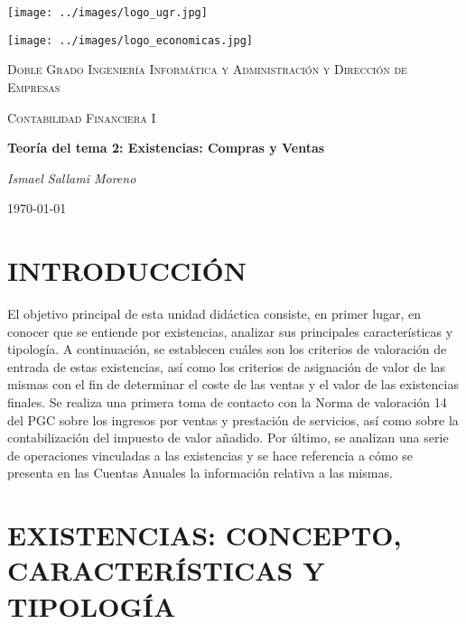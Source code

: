 \documentclass{article}
\newcommand{\myTitle}{Teoría del tema 2: Existencias: Compras y Ventas}
\newcommand{\myAuthor}{Ismael Sallami Moreno}
\newcommand{\myDegree}{Doble Grado Ingeniería Informática y Administración y Dirección de Empresas}
\newcommand{\mySubject}{Contabilidad Financiera I}
\newcommand{\myDate}{\today}
\begin{document}
\begin{titlepage}
    \centering
    \begin{minipage}{0.45\textwidth}
        \centering
        \texttt{[image: ../images/logo\_ugr.jpg]}
    \end{minipage}    \hfill
    \begin{minipage}{0.45\textwidth}
        \centering
        \texttt{[image: ../images/logo\_economicas.jpg]} 
    \end{minipage}
    \vspace{1cm}
    
    {\scshape\LARGE \myDegree \par}
    \vspace{1cm}
    {\scshape\Large \mySubject \par}
    \vspace{1.5cm}
    {\huge\bfseries \myTitle \par}
    \vspace{2cm}
    {\Large\itshape \myAuthor \par}
    \vfill
    \myDate\par
\end{titlepage}

\tableofcontents
\newpage

\section{INTRODUCCIÓN}

El objetivo principal de esta unidad didáctica consiste, en primer lugar, en conocer que se entiende por existencias, analizar sus principales características y tipología. A continuación, se establecen cuáles son los criterios de valoración de entrada de estas existencias, así como los criterios de asignación de valor de las mismas con el fin de determinar el coste de las ventas y el valor de las existencias finales. Se realiza una primera toma de contacto con la Norma de valoración 14 del PGC sobre los ingresos por ventas y prestación de servicios, así como sobre la contabilización del impuesto de valor añadido. Por último, se analizan una serie de operaciones vinculadas a las existencias y se hace referencia a cómo se presenta en las Cuentas Anuales la información relativa a las mismas.

\section{EXISTENCIAS: CONCEPTO, CARACTERÍSTICAS Y TIPOLOGÍA}
\end{document}
